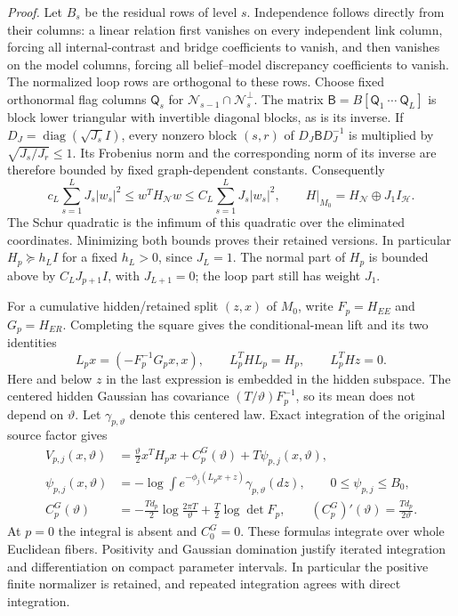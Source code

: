 \emph{Proof.}
Let $B_s$ be the residual rows of level $s$. Independence follows
directly from their columns: a linear relation first vanishes on every
independent link column, forcing all internal-contrast and bridge
coefficients to vanish, and then vanishes on the model columns, forcing
all belief--model discrepancy coefficients to vanish. The normalized
loop rows are orthogonal to these rows. Choose fixed orthonormal flag
columns $\mathsf Q_s$ for
$\mathcal N_{s-1}\cap\mathcal N_s^\perp$. The matrix
$\mathsf B=B[\mathsf Q_1\ \cdots\ \mathsf Q_L]$ is block lower triangular with
invertible diagonal blocks, as is its inverse. If
$D_J=\operatorname{diag}(\sqrt{J_s}I)$, every nonzero block $(s,r)$ of
$D_J\mathsf B D_J^{-1}$ is multiplied by
$\sqrt{J_s/J_r}\le1$. Its Frobenius norm and the corresponding norm of
its inverse are therefore bounded by fixed graph-dependent constants.
Consequently
\begin{equation}
 c_L\sum_{s=1}^L J_s|w_s|^2
 \le w^TH_{\mathcal N}w
 \le C_L\sum_{s=1}^L J_s|w_s|^2,
 \qquad
 H|_{M_0}=H_{\mathcal N}\oplus J_1I_{\mathcal H}.
 \label{eq:rg-formation-weighted-proof}
\end{equation}
The Schur quadratic is the infimum of this quadratic over the
eliminated coordinates. Minimizing both bounds proves their retained
versions. In particular $H_p\succeq h_LI$ for a fixed $h_L>0$, since
$J_L=1$. The normal part of $H_p$ is bounded above by
$C_LJ_{p+1}I$, with $J_{L+1}=0$; the loop part still has weight $J_1$.

For a cumulative hidden/retained split $(z,x)$ of $M_0$, write
$F_p=H_{EE}$ and $G_p=H_{ER}$. Completing the square gives the
conditional-mean lift and its two identities
\begin{equation}
 L_px=(-F_p^{-1}G_px,x),\qquad
 L_p^THL_p=H_p,\qquad L_p^THz=0.
 \label{eq:rg-formation-gaussian-lift}
\end{equation}
Here and below $z$ in the last expression is embedded in the hidden
subspace. The centered hidden Gaussian has covariance
$(T/\vartheta)F_p^{-1}$, so its mean does not depend on $\vartheta$.
Let $\gamma_{p,\vartheta}$ denote this centered law. Exact integration
of the original source factor gives
\begin{align}
 V_{p,j}(x,\vartheta)
 &=\frac{\vartheta}{2}x^TH_px+C_p^G(\vartheta)
       +T\psi_{p,j}(x,\vartheta),
 \label{eq:rg-formation-parent-potential-proof}\\
 \psi_{p,j}(x,\vartheta)
 &=-\log\int e^{-\phi_j(L_px+z)}
                  \gamma_{p,\vartheta}(dz),
 \qquad 0\le\psi_{p,j}\le B_0,
 \label{eq:rg-formation-parent-tilt-proof}\\
 C_p^G(\vartheta)
 &=-\frac{Td_p}{2}\log\frac{2\pi T}{\vartheta}
       +\frac T2\log\det F_p,
 \qquad (C_p^G)'(\vartheta)=\frac{Td_p}{2\vartheta}.
 \label{eq:rg-formation-hidden-scalar-proof}
\end{align}
At $p=0$ the integral is absent and $C_0^G=0$. These formulas integrate
over whole Euclidean fibers. Positivity and Gaussian domination
justify iterated integration and differentiation on compact parameter
intervals. In particular the positive finite normalizer is retained,
and repeated integration agrees with direct integration.

